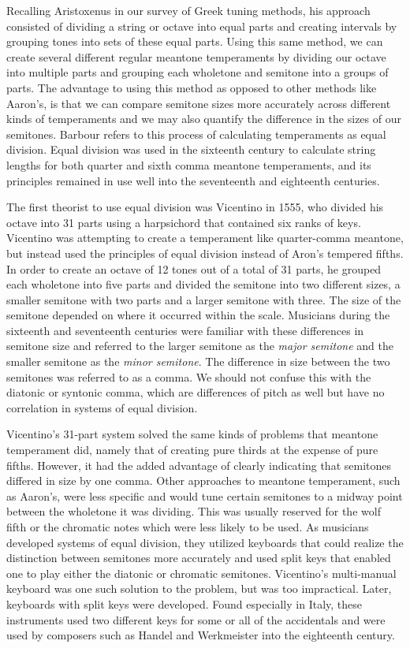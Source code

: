 Recalling Aristoxenus in our survey of Greek tuning methods, his approach consisted of
dividing a string or octave into equal parts and creating intervals by grouping tones into
sets of these equal parts. Using this same method, we can create several different regular
meantone temperaments by dividing our octave into multiple parts and grouping each
wholetone and semitone into a groups of parts. The advantage to using this method as
opposed to other methods like Aaron's, is that we can compare semitone sizes more
accurately across different kinds of temperaments and we may also quantify the difference
in the sizes of our semitones. Barbour refers to this process of calculating temperaments
as equal division. Equal division was used in the sixteenth century to calculate string
lengths for both quarter and sixth comma meantone temperaments, and its principles
remained in use well into the seventeenth and eighteenth centuries.

The first theorist to use equal division was Vicentino in 1555, who divided his octave
into 31 parts using a harpsichord that contained six ranks of keys. Vicentino was
attempting to create a temperament like quarter-comma meantone, but instead used the
principles of equal division instead of Aron's tempered fifths. In order to create an
octave of 12 tones out of a total of 31 parts, he grouped each wholetone into five
parts and divided the semitone into two different sizes, a smaller semitone with two
parts and a larger semitone with three.  The size of the semitone depended on where it
occurred within the scale. Musicians during the sixteenth and seventeenth centuries
were familiar with these differences in semitone size and referred to the larger
semitone as the \textit{major semitone} and the smaller semitone as the \textit{minor
semitone}.  The difference in size between the two semitones was referred to as a
comma.  We should not confuse this with the diatonic or syntonic comma, which are
differences of pitch as well but have no correlation in systems of equal division.

Vicentino's 31-part system solved the same kinds of problems that meantone temperament
did, namely that of creating pure thirds at the expense of pure fifths. However, it had
the added advantage of clearly indicating that semitones differed in size by one comma.
Other approaches to meantone temperament, such as Aaron's, were less specific and would
tune certain semitones to a midway point between the wholetone it was dividing.  This
was usually reserved for the wolf fifth or the chromatic notes which were less likely
to be used.  As musicians developed systems of equal division, they utilized keyboards
that could realize the distinction between semitones more accurately and used split
keys that enabled one to play either the diatonic or chromatic semitones.  Vicentino's
multi-manual keyboard was one such solution to the problem, but was too impractical.
Later, keyboards with split keys were developed.  Found especially in Italy, these
instruments used two different keys for some or all of the accidentals and were used by
composers such as Handel and Werkmeister into the eighteenth century.
\autocite[108]{MB:1}

